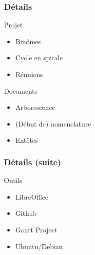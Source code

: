 \begin{frame}
\frametitle{Détails}

\begin{block}{Projet}
\begin{itemize}
	\item Binômes %
	\item Cycle en spirale %
	\item Réunions %
\end{itemize}
\end{block} %

\begin{block}{Documents}
\begin{itemize}
	\item Arborescence %
	\item (Début de) nomenclature %
	\item Entêtes %
\end{itemize}
\end{block} %

\end{frame} %

\begin{frame}
\frametitle{Détails (suite)}

\begin{block}{Outils} %
\begin{itemize}
    \item LibreOffice %
    \item Github %
    \item Gantt Project %
	\item Ubuntu/Debian %
\end{itemize}
\end{block} %

\end{frame} %

